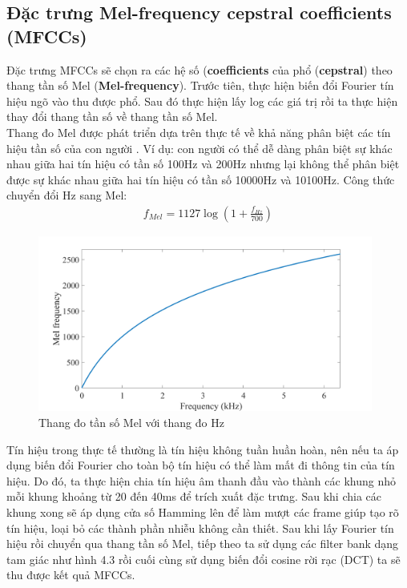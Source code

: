 \documentclass[a4paper, 12pt]{article}
\begin{document}
\subsection{Đặc trưng Mel-frequency cepstral coefficients (MFCCs)}
Đặc trưng MFCCs sẽ chọn ra các hệ số (\textbf{coefficients} của phổ (\textbf{cepstral}) theo thang tần số Mel (\textbf{Mel-frequency}). Trước tiên, thực hiện biến đổi Fourier tín hiệu ngõ vào thu được phổ. Sau đó thực hiện lấy log các giá trị rồi ta thực hiện thay đổi thang tần số về thang tần số Mel.\\
Thang đo Mel được phát triển dựa trên thực tế về khả năng
phân biệt các tín hiệu tần số của con người \cite{stevens1937scale}. Ví dụ: con người có thể dễ dàng phân biệt sự khác nhau giữa hai tín hiệu có tần số 100Hz và 200Hz nhưng lại không thể phân biệt được sự khác nhau giữa hai tín hiệu có tần số 10000Hz và 10100Hz. Công thức chuyển đổi Hz sang Mel:
\begin{align*}
f_{Mel}  =1127 \log \left(1 + \frac{f_{Hz}}{700}  \right)
\end{align*}
\begin{figure}[!h]
\captionsetup{width=0.8\textwidth}
\centering
\includegraphics[width=11cm]{images/4.2.png}
\caption{Thang đo tần số Mel với thang đo Hz \cite{backstrom2019cepstrum}}
\end{figure}
Tín hiệu trong thực tế thường là tín hiệu không tuần huần hoàn, nên nếu ta áp dụng biến đổi Fourier cho toàn bộ tín hiệu có thể làm mất đi thông tin của tín hiệu. Do đó, ta thực hiện chia tín hiệu âm thanh đầu vào thành các khung nhỏ mỗi khung khoảng từ 20 đến 40ms để trích xuất đặc trưng. Sau khi chia các khung xong sẽ áp dụng cửa số Hamming lên để làm mượt các frame giúp tạo rõ tín hiệu, loại bỏ các thành phần nhiễu không cần thiết. Sau khi lấy Fourier tín hiệu rồi chuyển qua thang tần số Mel, tiếp theo ta sử dụng các filter bank dạng tam giác như hình 4.3 rồi cuối cùng sử dụng biến đổi cosine rời rạc (DCT) ta sẽ thu được kết quả MFCCs.
\end{document}
